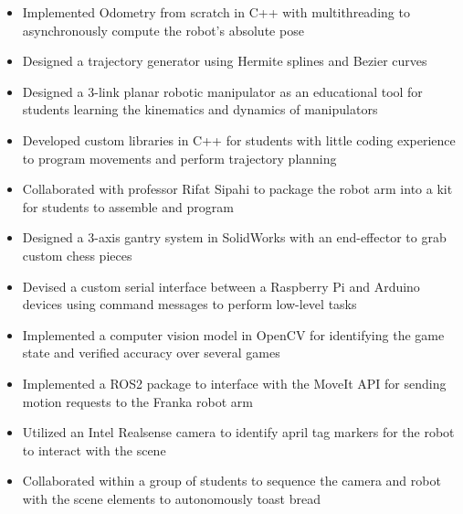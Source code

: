 \documentclass[10pt,a4paper,ragged2e,withhyper]{altacv}
\begin{document}
    \begin{itemize}
        \item Implemented Odometry from scratch in C++ with multithreading to asynchronously compute the robot's absolute pose
        \item Designed a trajectory generator using Hermite splines and Bezier curves
    \end{itemize}
    \begin{itemize}
        \item Designed a 3-link planar robotic manipulator as an educational tool for students learning the kinematics and dynamics of manipulators
        \item Developed custom libraries in C++ for students with little coding experience to program movements and perform trajectory planning
        \item Collaborated with professor Rifat Sipahi to package the robot arm into a kit for students to assemble and program
    \end{itemize}
    \begin{itemize}
        \item Designed a 3-axis gantry system in SolidWorks with an end-effector to grab custom chess pieces
        \item Devised a custom serial interface between a Raspberry Pi and Arduino devices using command messages to perform low-level tasks
        \item Implemented a computer vision model in OpenCV for identifying the game state and verified accuracy over several games
    \end{itemize}
    \begin{itemize}
        \item Implemented a ROS2 package to interface with the MoveIt API for sending motion requests to the Franka robot arm
        \item Utilized an Intel Realsense camera to identify april tag markers for the robot to interact with the scene
        \item Collaborated within a group of students to sequence the camera and robot with the scene elements to autonomously toast bread
    \end{itemize}
\end{document}
